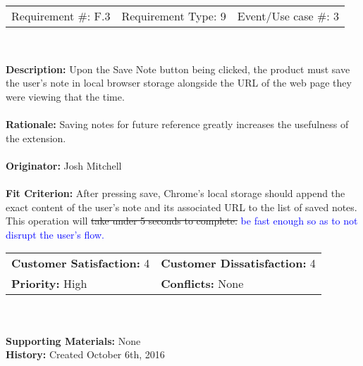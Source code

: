 \documentclass[12pt, titlepage]{article}
\begin{document}
\begin{framed}
	
	\begin{center}
		
		\begin{tabular}{ l c r }
			Requirement \#: F.3 & Requirement Type: 9 & Event/Use case \#: 3\\
		\end{tabular} \\
	\end{center}
	\textbf{Description:} Upon the Save Note button being clicked, the product 
	must save the user's note in local browser storage alongside the URL of the 
	web page they were viewing that the time. \\
	\\
	\textbf{Rationale:} Saving notes for future reference greatly increases the 
	usefulness of the extension. \\
	\\
	\textbf{Originator:} Josh Mitchell \\
	\\
	\textbf{Fit Criterion:} After pressing save, Chrome's local storage should 
	append the exact content of the user's note and its associated URL to the 
	list of saved notes. This operation will \sout{take under 5 seconds to 
	complete. } \textcolor{blue}{be fast enough so as to 
		not disrupt the user's flow.}
	\\
	
	\begin{tabular}{ll}
		\textbf{Customer Satisfaction:} 4 & \textbf{Customer Dissatisfaction:} 
		4 \\
		\textbf{Priority:} High & \textbf{Conflicts:} None\\
	\end{tabular} \\
	\\
	\textbf{Supporting Materials:} None \\
	\textbf{History:} Created October 6th, 2016
	
\end{framed}
\end{document}
